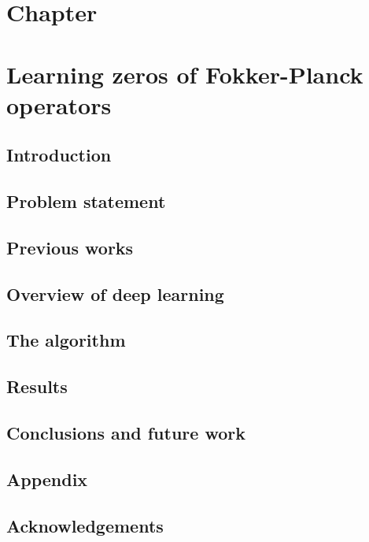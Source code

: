 \chapter*{Chapter }
\textit{}
\newpage

\chapter{Learning zeros of Fokker-Planck operators}
\section{Introduction}\label{sec-intro--steady-fp}

\section{Problem statement}
\label{sec-prob--steady-fp}

\section{Previous works}\label{sec-prev-work--steady-fp}

\section{Overview of deep learning}
\label{sec-learning--steady-fp}


\section{The algorithm}
\label{sec-algo--steady-fp}

\section{Results}\label{sec-steady-res--steady-fp}



\section{Conclusions and future work}
\label{sec-conclusions--steady-fp}


\section{Appendix}
\label{sec-appendix--steady-fp}


\section*{Acknowledgements}




